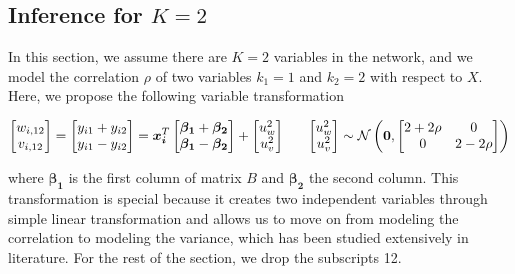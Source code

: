 \documentclass[12pt]{article}
\theoremstyle{theorem}
\begin{document}
\subsection{Inference for $K=2$}
In this section, we assume there are $K=2$ variables in the network, and we model the correlation $\rho$ of two variables $k_1 = 1$ and $k_2 = 2$ with respect to $X$. Here, we propose the following variable transformation
\begin{singlespace}
$$\begin{bmatrix} w_{i,12} \\ v_{i,12} \end{bmatrix} = 
\begin{bmatrix} y_{i1} + y_{i2} \\ y_{i1} - y_{i2} \end{bmatrix} = 
 \bm{x_i}^T \begin{bmatrix} \bm{\beta_1} + \bm{\beta_2} \\ \bm{\beta_1} - \bm{\beta_2}\end{bmatrix} + \begin{bmatrix} u_w^2 \\ u_v^2\end{bmatrix} \hspace{6mm} \begin{bmatrix} u_w^2 \\ u_v^2\end{bmatrix} \sim  \mathcal{N} \left( \bm{0}, \begin{bmatrix} 2 + 2\rho & 0 \\ 0 & 2-2\rho \end{bmatrix} \right)$$
 \label{transformed_model}
 \end{singlespace}
\noindent where $\bm{\beta_1}$ is the first column of matrix $B$ and $\bm{\beta_2}$ the second column. This transformation is special because it creates two independent variables through simple linear transformation and allows us to move on from modeling the correlation to modeling the variance, which has been studied extensively in literature. For the rest of the section, we drop the subscripts 12. \\
\end{document}
